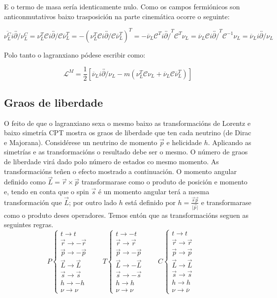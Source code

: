\documentclass[a4paper,10pt]{article}
\newcommand{\beq}{\begin{equation}}
\newcommand{\eeq}{\end{equation}}
\newcommand{\bc}{\begin{cases}}
\newcommand{\ec}{\end{cases}}
\newcommand{\barra}[1]{\overline{#1}}
\newcommand{\abs}[1]{\vert #1 \vert}
\newcommand{\rvec}[1]{\overrightarrow{#1}}
\newcommand{\dvec}[1]{\overleftrightarrow{#1}}
\newcommand{\chula}[1]{\mathcal{#1}}
\newcommand{\slx}[1]{ #1\!\!\!/ }
\begin{document}
E o termo de masa sería identicamente nulo. Como os campos fermiónicos son anticonmutativos baixo trasposición na parte cinemática ocorre o seguinte:

\beq
\barra{\nu_L^C} i\dvec{\slx\partial} \nu_L^C = \nu_L^T \chula C i\dvec{\slx\partial} \chula C \barra{\nu}_L^T = - \left( \nu_L^T \chula C i \dvec{\slx\partial} \chula C \barra\nu_L^T \right)^T = - \barra\nu_L \chula C^T i \dvec{\slx\partial}^T \chula C^T \nu_L = \barra\nu_L \chula C i\dvec{\slx\partial}^T \chula C^{-1} \nu_L = \barra\nu_L i\dvec{\slx\partial} \nu_L
\eeq

Polo tanto o lagranxiano pódese escribir como:

\beq
\chula L^M = \frac{1}{2} \left[ \barra\nu_L i \dvec{\slx\partial} \nu_L - m \left( \nu_L^T \chula C \nu_L + \barra\nu_L \chula C \barra\nu_L^T \right) \right]
\eeq

\subsection{Graos de liberdade}

	O feito de que o lagranxiano sexa o mesmo baixo as transformacións de Lorentz e baixo simetría CPT mostra os graos de liberdade que ten cada neutrino (de Dirac e Majorana). Considérese un neutrino de momento $\rvec p$ e helicidade $h$. Aplicando as simetrías e as transformacións o resultado debe ser o mesmo. O número de graos de liberdade virá dado polo número de estados co mesmo momento. As transformacións teñen o efecto mostrado a continuación. O momento angular definido como $\rvec L = \rvec r \times \rvec p$ transformarase como o produto de posición e momento e, tendo en conta que o spin $\rvec s$ é un momento angular terá a mesma transformación que $\rvec L$; por outro lado $h$ está definido por $h = \frac{\vec s \vec p}{\abs{\vec p}}$ e transformarase como o produto deses operadores. Temos entón que as transformacións seguen as seguintes regras.
\beq
P\bc t \rightarrow t \\ \rvec r \rightarrow -\rvec r \\  \rvec p \rightarrow -\rvec p \\  \rvec L \rightarrow \rvec L \\  \rvec s \rightarrow \rvec s \\ h \rightarrow -h \\  \nu \rightarrow \nu \ec \qquad
T\bc t \rightarrow -t \\ \rvec r \rightarrow \rvec r \\  \rvec p \rightarrow -\rvec p \\  \rvec L \rightarrow -\rvec L \\  \rvec s \rightarrow -\rvec s \\ h \rightarrow h \\  \nu \rightarrow \nu \ec \qquad
C\bc t \rightarrow t \\ \rvec r \rightarrow \rvec r \\  \rvec p \rightarrow \rvec p \\  \rvec L \rightarrow \rvec L \\  \rvec s \rightarrow \rvec s \\ h \rightarrow h \\  \nu \rightarrow \barra\nu \ec \qquad
\eeq
\end{document}

